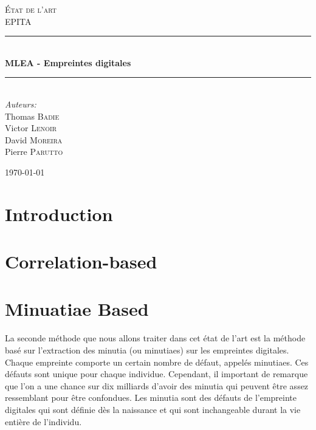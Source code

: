 \documentclass{report}
\newcommand{\HRule}{\rule{\linewidth}{0.5mm}}
\begin{document}
\begin{titlepage}

\begin{center}

\textsc{\LARGE \'Etat de l'art}\\[1.5cm]

\textsc{\Large EPITA}\\[0.5cm]

\HRule \\[0.4cm]
{ \huge \bfseries MLEA - Empreintes digitales}\\[0.4cm]

\HRule \\[1.5cm]

\large
\emph{Auteurs:}\\
Thomas \textsc{Badie}\\
Victor \textsc{Lenoir}\\
David \textsc{Moreira}\\
Pierre \textsc{Parutto}\\

\vfill

{\large \today}

\end{center}

\end{titlepage}
\newpage
\tableofcontents
\newpage

\chapter{Introduction}




\chapter{Correlation-based}
\chapter{Minuatiae Based}

La seconde méthode que nous allons traiter dans cet état de l'art est
la méthode basé sur l'extraction des minutia (ou minutiaes) sur les
empreintes digitales. Chaque empreinte comporte un certain nombre de
défaut, appelés minutiaes. Ces défauts sont unique pour chaque
individue. Cependant, il important de remarque que l'on a une chance
sur dix milliards d'avoir des minutia qui peuvent être assez
ressemblant pour être confondues. Les minutia sont des défauts de
l'empreinte digitales qui sont définie dès la naissance et qui sont
inchangeable durant la vie entière de l'individu.
\end{document}
